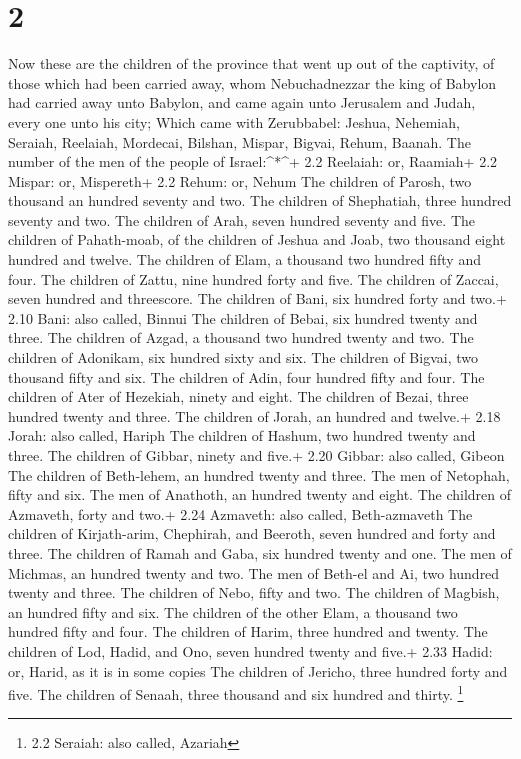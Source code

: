 \hypertarget{section-1}{%
\section{2}\label{section-1}}

 Now these are the children of the province that went up out
of the captivity, of those which had been carried away, whom
Nebuchadnezzar the king of Babylon had carried away unto Babylon, and
came again unto Jerusalem and Judah, every one unto his city;
 Which came with Zerubbabel: Jeshua, Nehemiah, Seraiah,
Reelaiah, Mordecai, Bilshan, Mispar, Bigvai, Rehum, Baanah. The number
of the men of the people of Israel:\^{}*\^{}+ 2.2 Reelaiah: or, Raamiah+
2.2 Mispar: or, Mispereth+ 2.2 Rehum: or, Nehum  The
children of Parosh, two thousand an hundred seventy and two.
 The children of Shephatiah, three hundred seventy and two.
 The children of Arah, seven hundred seventy and five.
 The children of Pahath-moab, of the children of Jeshua and
Joab, two thousand eight hundred and twelve.  The children
of Elam, a thousand two hundred fifty and four.  The
children of Zattu, nine hundred forty and five.  The
children of Zaccai, seven hundred and threescore.  The
children of Bani, six hundred forty and two.+ 2.10 Bani: also called,
Binnui  The children of Bebai, six hundred twenty and
three.  The children of Azgad, a thousand two hundred
twenty and two.  The children of Adonikam, six hundred
sixty and six.  The children of Bigvai, two thousand fifty
and six.  The children of Adin, four hundred fifty and
four.  The children of Ater of Hezekiah, ninety and eight.
 The children of Bezai, three hundred twenty and three.
 The children of Jorah, an hundred and twelve.+ 2.18 Jorah:
also called, Hariph  The children of Hashum, two hundred
twenty and three.  The children of Gibbar, ninety and
five.+ 2.20 Gibbar: also called, Gibeon  The children of
Beth-lehem, an hundred twenty and three.  The men of
Netophah, fifty and six.  The men of Anathoth, an hundred
twenty and eight.  The children of Azmaveth, forty and
two.+ 2.24 Azmaveth: also called, Beth-azmaveth  The
children of Kirjath-arim, Chephirah, and Beeroth, seven hundred and
forty and three.  The children of Ramah and Gaba, six
hundred twenty and one.  The men of Michmas, an hundred
twenty and two.  The men of Beth-el and Ai, two hundred
twenty and three.  The children of Nebo, fifty and two.
 The children of Magbish, an hundred fifty and six.
 The children of the other Elam, a thousand two hundred
fifty and four.  The children of Harim, three hundred and
twenty.  The children of Lod, Hadid, and Ono, seven hundred
twenty and five.+ 2.33 Hadid: or, Harid, as it is in some copies
 The children of Jericho, three hundred forty and five.
 The children of Senaah, three thousand and six hundred and
thirty. \footnote{2.2 Seraiah: also called, Azariah}

